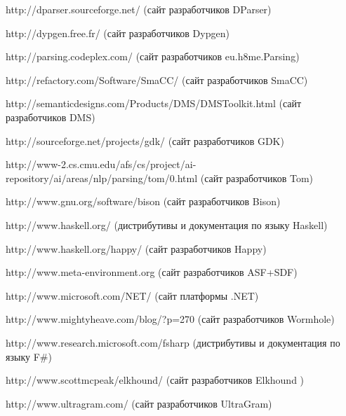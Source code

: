 \begin{thebibliography}{50}
         http://dparser.sourceforge.net/ (сайт разработчиков DParser)

         http://dypgen.free.fr/  (сайт разработчиков Dypgen)

         http://parsing.codeplex.com/ (сайт разработчиков eu.h8me.Parsing)

         http://refactory.com/Software/SmaCC/ (сайт разработчиков SmaCC)

         http://semanticdesigns.com/Products/DMS/DMSToolkit.html (сайт разработчиков DMS)

         http://sourceforge.net/projects/gdk/ (сайт разработчиков GDK)

               http://www-2.cs.cmu.edu/afs/cs/project/ai-repository/ai/areas/nlp/parsing/tom/0.html (сайт разработчиков Tom)

            http://www.gnu.org/software/bison (сайт разработчиков Bison)

          http://www.haskell.org/ (дистрибутивы и документация по языку Haskell)

            http://www.haskell.org/happy/ (сайт разработчиков Happy)

          http://www.meta-environment.org (сайт разработчиков ASF+SDF)

             http://www.microsoft.com/NET/ (сайт платформы .NET)  

          http://www.mightyheave.com/blog/?p=270 (сайт разработчиков Wormhole)

               http://www.research.microsoft.com/fsharp (дистрибутивы и документация по языку F\#)             

         http://www.scottmcpeak/elkhound/ (сайт разработчиков Elkhound )

         http://www.ultragram.com/ (сайт разработчиков UltraGram)

\end{thebibliography}

